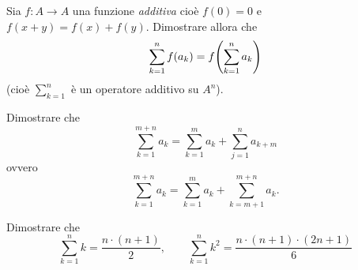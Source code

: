 \begin{exercise}
  Sia $f\colon A\to A$ una funzione \emph{additiva}
  cioè $f(0) = 0$ e $f(x+y)=f(x)+f(y)$.
  Dimostrare allora che 
  \[
    \sum_{k=1}^n  f(a_k) = f{\left( \sum_{k=1}^n a_k \right)}
  \]
  (cioè $\sum_{k=1}^n$ è un operatore additivo su $A^n$).
\end{exercise}

\begin{exercise}
  Dimostrare che 
  \[
  \sum_{k=1}^{m+n} a_k = \sum_{k=1}^m a_k + \sum_{j=1}^n a_{k+m}
  \]
  ovvero 
  \[
  \sum_{k=1}^{m+n} a_k = \sum_{k=1}^m a_k + \sum_{k=m+1}^{m+n} a_k.  
  \]

\end{exercise}

\begin{exercise}
  Dimostrare che 
  \[
    \sum_{k=1}^n k = \frac{n\cdot (n+1)}{2}, \qquad
    \sum_{k=1}^n k^2 = \frac{n\cdot (n+1)\cdot (2n+1)}{6}
  \]
\end{exercise}
